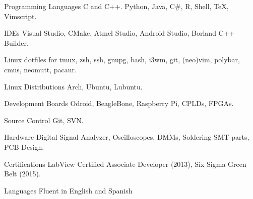
\begin{cvskills}


	\cvskill
		{Programming Languages}
			{C and C++. Python, Java, C\#, R, Shell, \TeX, Vimscript.}

	\cvskill
		{IDEs}
			{Visual Studio, CMake, Atmel Studio, Android Studio, Borland C++ Builder.}

	\cvskill
		{Linux dotfiles for}
			{tmux, zsh, ssh, gnupg, bash, i3wm, git, (neo)vim, polybar, cmus, neomutt, pacaur.}

	\cvskill
		{Linux Distributions}
			{Arch, Ubuntu, Lubuntu.}

	\cvskill
		{Development Boards}
			{Odroid, BeagleBone, Raspberry Pi, CPLDs, FPGAs.}

	\cvskill
		{Source Control}
			{Git, SVN.}

	\cvskill
		{Hardware}
			{Digital Signal Analyzer, Oscilloscopes, DMMs, Soldering SMT parts, PCB Design.}

	\cvskill
		{Certifications}
			{LabView Certified Associate Developer (2013), Six Sigma Green Belt (2015).}

	\cvskill
		{Languages}
			{Fluent in English and Spanish}

\end{cvskills}
